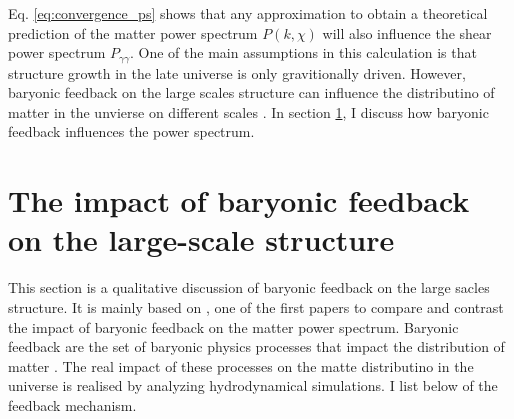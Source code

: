Eq. \ref{eq:convergence_ps} shows that any approximation to obtain a theoretical prediction of the matter power spectrum $P(k, \chi)$ will also influence the shear power spectrum $P_{\gamma \gamma}$. One of the main assumptions in this calculation is that structure growth in the late universe is only gravitionally driven. However, baryonic feedback on the large scales structure can influence the distributino of matter in the unvierse on different scales \citep{van2011effects}. In section \ref{theory_sec:BF}, I discuss how baryonic feedback influences the power spectrum. 


\section{The impact of baryonic feedback on the large-scale structure}\label{theory_sec:BF}
This section is a qualitative discussion of baryonic feedback on the large sacles structure. It is mainly based on \citet{van2011effects}, one of the first papers to compare and contrast the impact of baryonic feedback on the matter power spectrum. Baryonic feedback are the set of baryonic physics processes that impact the distribution of matter \citep{Rudd_Zentner_Kravtsov_2008}. The real impact of these processes on the matte distributino in the universe is realised by analyzing hydrodynamical simulations. I list below of the feedback mechanism.

